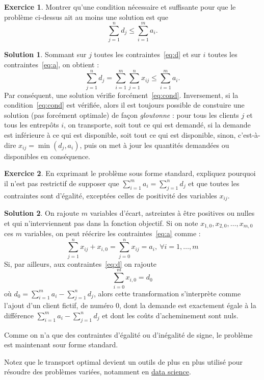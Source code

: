\documentclass[a4paper,francais]{article}
\theoremstyle{definition}
\newtheorem{exercice}{Exercice}[section]
\newtheorem*{solution}{Solution}
\begin{document}
\begin{exercice}
  Montrer qu'une condition nécessaire et suffisante pour que le problème ci-dessus ait au
  moins une solution est que
  \begin{equation}
    \label{eq:cond}
    \sum_{j = 1}^n d_j \leq \sum_{i = 1}^m a_i.
  \end{equation}
\end{exercice}

\begin{solution}
  Sommant sur $j$ toutes les contraintes~\ref{eq:d} et sur $i$ toutes les contraintes~\ref{eq:a},
  on obtient :
  \[
  \sum_{j = 1}^n d_j = \sum_{i = 1}^m\sum_{j = 1}^n x_{ij} \leq \sum_{i = 1}^m a_i.
  \]
  Par conséquent, une solution vérifie forcément~\ref{eq:cond}. Inversement,
  si la condition~\ref{eq:cond} est vérifiée, alors il est toujours possible de
  constuire une solution (pas forcément optimale) de façon \emph{gloutonne} :
  pour tous les clients $j$ et tous les entrepôts $i$, on transporte, soit
  tout ce qui est demandé, si la demande est inférieure à ce qui est disponible,
  soit tout ce qui est disponible, sinon, c'est-à-dire $x_{ij} = \min(d_j,a_i)$,
  puis on met à jour les quantités demandées ou disponibles en conséquence. 
\end{solution}

\begin{exercice}
  En exprimant le problème sous forme standard, expliquez pourquoi il n'est pas restrictif
  de supposer que $\sum_{i = 1}^m a_i = \sum_{j = 1}^n d_j$ et que toutes les contraintes
  sont d'égalité, exceptées celles de positivité des variables $x_{ij}$.
\end{exercice}

\begin{solution}
  On rajoute $m$ variables d'écart, astreintes à être positives ou nulles
  et qui n'interviennent pas dans la fonction objectif.
  Si on note $x_{1,0}, x_{2,0}, \dots, x_{m,0}$ ces $m$ variables, on peut réécrire
  les contraintes~\ref{eq:a} comme :
  \[
  \sum_{j = 1}^n x_{ij} + x_{i,0} = \sum_{j = 0}^n x_{ij} = a_i, \ \forall i = 1, \dots, m
  \]
  Si, par ailleurs, aux contraintes~\ref{eq:d} on rajoute
  \[
  \sum_{i = 0}^m x_{i,0} = d_0
  \]
  où $d_0 = \sum_{i = 1}^m a_i - \sum_{j = 1}^n d_j$, alors cette transformation s'interprète
  comme l'ajout d'un client fictif, de numéro $0$, dont la demande est exactement égale à
  la différence $\sum_{i = 1}^m a_i - \sum_{j = 1}^n d_j$ et dont les coûts d'acheminement
  sont nuls.

  Comme on n'a que des contraintes d'égalité ou d'inégalité de signe, le problème est
  maintenant sour forme standard. 
\end{solution}

Notez que le transport optimal devient un outils de plus en plus utilisé pour résoudre
des problèmes variées, notamment en
\href{https://weave.eu/le-transport-optimal-un-couteau-suisse-pour-la-data-science/}{data science}. 
\end{document}
